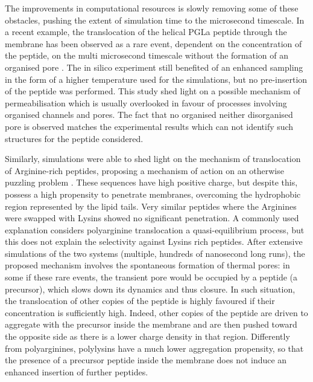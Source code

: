 The improvements in computational resources is slowly removing some of these obstacles, pushing the extent of simulation time to the microsecond timescale.
%
In a recent example, the translocation of the helical PGLa peptide through the membrane has been observed as a rare event, dependent on the concentration of the peptide, on the multi microsecond timescale without the formation of an organised pore \cite{Ulmschneider2017}. The in silico experiment still benefited of an enhanced sampling in the form of a higher temperature used for the simulations, but no pre-insertion of the peptide was performed.  This study shed light on a possible mechanism of permeabilisation which is usually overlooked in favour of processes involving organised channels and pores. The fact that no organised neither disorganised pore is observed matches the experimental results which can not identify such structures for the peptide considered. 

Similarly, simulations were able to shed light on the mechanism of translocation of Arginine-rich peptides, proposing a mechanism of action on an otherwise puzzling problem \cite{Sun2015}. These sequences have high positive charge, but despite this, possess a high propensity to penetrate membranes, overcoming the hydrophobic region represented by the lipid tails. Very similar peptides where the Arginines were swapped with Lysins showed no significant penetration.
%
A commonly used explanation considers polyarginine translocation a quasi-equilibrium process, but this does not explain the selectivity against Lysins rich peptides.
%
After extensive simulations of the two systems (multiple, hundreds of nanosecond long runs), the proposed mechanism involves the spontaneous formation of thermal pores: in some if these rare events, the transient pore would be occupied by a peptide (a precursor), which slows down its dynamics and thus closure. In such situation, the translocation of other copies of the peptide is highly favoured if their concentration is sufficiently high. Indeed, other copies of the peptide are driven to aggregate with the precursor inside the membrane and are then pushed toward the opposite side as there is a lower charge density in that region.
%
Differently from polyarginines, polylysins have a much lower aggregation propensity, so that the presence of a precursor peptide inside the membrane does not induce an enhanced insertion of further peptides.

